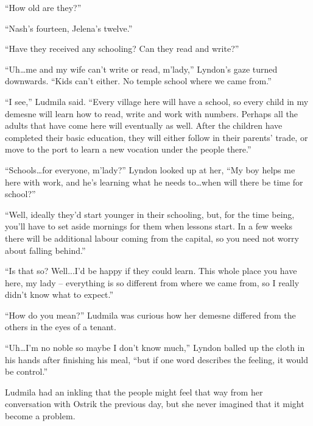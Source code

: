  

“How old are they?”

 

“Nash’s fourteen, Jelena’s twelve.”

 

“Have they received any schooling? Can they read and write?”

 

“Uh…me and my wife can’t write or read, m’lady,” Lyndon’s gaze turned downwards. “Kids can’t either. No temple school where we came from.”

 

“I see,” Ludmila said. “Every village here will have a school, so every child in my demesne will learn how to read, write and work with numbers. Perhaps all the adults that have come here will eventually as well. After the children have completed their basic education, they will either follow in their parents’ trade, or move to the port to learn a new vocation under the people there.”

 

“Schools…for everyone, m’lady?” Lyndon looked up at her, “My boy helps me here with work, and he’s learning what he needs to…when will there be time for school?”

 

“Well, ideally they’d start younger in their schooling, but, for the time being, you’ll have to set aside mornings for them when lessons start. In a few weeks there will be additional labour coming from the capital, so you need not worry about falling behind.”

 

“Is that so? Well...I’d be happy if they could learn. This whole place you have here, my lady – everything is so different from where we came from, so I really didn’t know what to expect.”

 

“How do you mean?” Ludmila was curious how her demesne differed from the others in the eyes of a tenant.

 

“Uh…I’m no noble so maybe I don’t know much,” Lyndon balled up the cloth in his hands after finishing his meal, “but if one word describes the feeling, it would be control.”

 

Ludmila had an inkling that the people might feel that way from her conversation with Ostrik the previous day, but she never imagined that it might become a problem.

